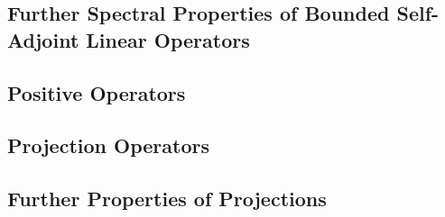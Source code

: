 \subsection{Further Spectral Properties of Bounded Self-Adjoint Linear Operators}
\subsection{Positive Operators}
\setcounter{subsection}{4}
\subsection{Projection Operators}
\subsection{Further Properties of Projections}
